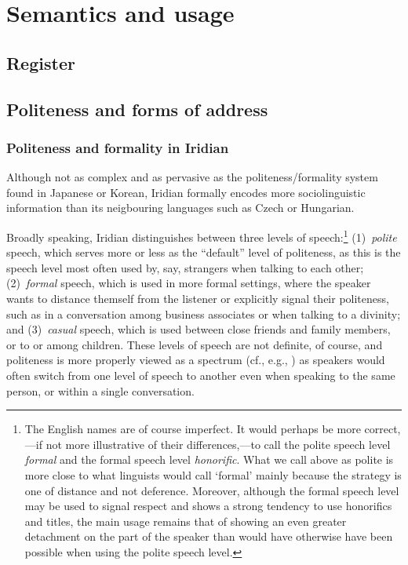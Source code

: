 \chapter{Semantics and usage}

\section{Register}
\section{Politeness and forms of address}\label{sec:politaddr}

\subsection{Politeness and formality in Iridian}

Although not as complex and as pervasive as the politeness/formality system found in Japanese or Korean, Iridian formally encodes more sociolinguistic information than its neigbouring languages such as Czech or Hungarian.

Broadly speaking, Iridian distinguishes between three levels of speech:\footnote{
	The English names are of course imperfect. It would perhaps be more correct,---if not more illustrative of their differences,---to call the polite speech level \emph{formal} and the formal speech level \emph{honorific}. What we call above as polite is more close to what linguists would call `formal' mainly because the strategy is one of distance and not deference. Moreover, although the formal speech level may be used to signal respect and shows a strong tendency to use honorifics and titles, the main usage remains that of showing an even greater detachment on the part of the speaker than would have otherwise have been possible when using the polite speech level.
} (1)~\emph{polite} speech, which serves more or less as the ``default'' level of politeness, as this is the speech level most often used by, say, strangers when talking to each other; (2)~\emph{formal} speech, which is used in more formal settings, where the speaker wants to distance themself from the listener or explicitly signal their politeness, such as in a conversation among business associates or when talking to a divinity; and (3)~\emph{casual} speech, which is used between close friends and family members, or to or among children. These levels of speech are not definite, of course, and politeness is more properly viewed as a spectrum (cf., e.g., \cite{hansonjap}) as speakers would often switch from one level of speech to another even when speaking to the same person, or within a single conversation.


